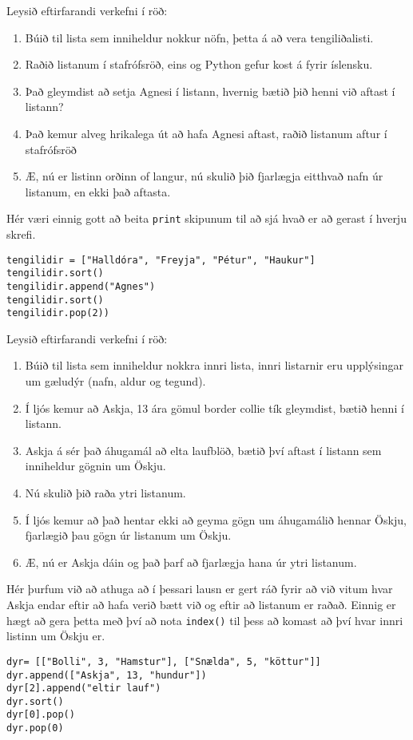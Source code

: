 \begin{exercise}\label{lst6}
Leysið eftirfarandi verkefni í röð:
\begin{enumerate}
	\item Búið til lista sem inniheldur nokkur nöfn, þetta á að vera tengiliðalisti.
	\item Raðið listanum í stafrófsröð, eins og Python gefur kost á fyrir íslensku.
	\item Það gleymdist að setja Agnesi í listann, hvernig bætið þið henni við aftast í listann?
	\item Það kemur alveg hrikalega út að hafa Agnesi aftast, raðið listanum aftur í stafrófsröð
	\item Æ, nú er listinn orðinn of langur, nú skulið þið fjarlægja eitthvað nafn úr listanum, en ekki það aftasta.
\end{enumerate}
\end{exercise}
\begin{Answer}[ref={lst6}]
Hér væri einnig gott að beita \texttt{print} skipunum til að sjá hvað er að gerast í hverju skrefi.
\begin{lstlisting}
tengilidir = ["Halldóra", "Freyja", "Pétur", "Haukur"]
tengilidir.sort()
tengilidir.append("Agnes")
tengilidir.sort()
tengilidir.pop(2))\end{lstlisting}
\end{Answer}

\begin{exercise}\label{lst7}
Leysið eftirfarandi verkefni í röð:
\begin{enumerate}
	\item Búið til lista sem inniheldur nokkra innri lista, innri listarnir eru upplýsingar um gæludýr (nafn, aldur og tegund).
	\item Í ljós kemur að Askja, 13 ára gömul border collie tík gleymdist, bætið henni í listann.
	\item Askja á sér það áhugamál að elta laufblöð, bætið því aftast í listann sem inniheldur gögnin um Öskju.
	\item Nú skulið þið raða ytri listanum.
	\item Í ljós kemur að það hentar ekki að geyma gögn um áhugamálið hennar Öskju, fjarlægið þau gögn úr listanum um Öskju.
	\item Æ, nú er Askja dáin og það þarf að fjarlægja hana úr ytri listanum.
\end{enumerate}
\end{exercise}
\begin{Answer}[ref={lst7}]
Hér þurfum við að athuga að í þessari lausn er gert ráð fyrir að við vitum hvar Askja endar eftir að hafa verið bætt við og eftir að listanum er raðað.
Einnig er hægt að gera þetta með því að nota \texttt{index()} til þess að komast að því hvar innri listinn um Öskju er.
\begin{lstlisting}
dyr= [["Bolli", 3, "Hamstur"], ["Snælda", 5, "köttur"]]
dyr.append(["Askja", 13, "hundur"])
dyr[2].append("eltir lauf") 
dyr.sort()
dyr[0].pop()
dyr.pop(0)\end{lstlisting}
\newpage
\end{Answer}